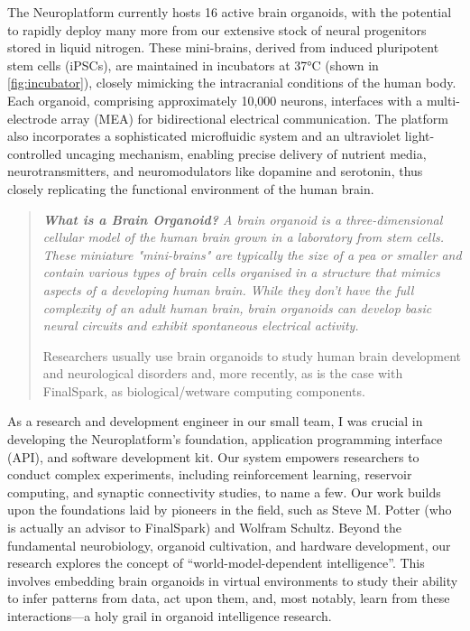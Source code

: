 \documentclass[10pt]{article}
\begin{document}
\begin{sloppypar}
  The Neuroplatform currently hosts 16 active brain organoids, with the potential to rapidly deploy many more from our extensive stock of neural progenitors stored in liquid nitrogen. These mini-brains, derived from induced pluripotent stem cells (iPSCs), are maintained in incubators at 37°C (shown in \autoref{fig:incubator}), closely mimicking the intracranial conditions of the human body. Each organoid, comprising approximately 10,000 neurons, interfaces with a multi-electrode array (MEA) for bidirectional electrical communication. The platform also incorporates a sophisticated microfluidic system and an ultraviolet light-controlled uncaging mechanism, enabling precise delivery of nutrient media, neurotransmitters, and neuromodulators like dopamine and serotonin, thus closely replicating the functional environment of the human brain.

  \begin{quote}
    \itshape
    \textbf{What is a Brain Organoid?}
    A brain organoid is a three-dimensional cellular model of the human brain grown in a laboratory from stem cells. These miniature "mini-brains" are typically the size of a pea or smaller and contain various types of brain cells organised in a structure that mimics aspects of a developing human brain. While they don't have the full complexity of an adult human brain, brain organoids can develop basic neural circuits and exhibit spontaneous electrical activity.

    Researchers usually use brain organoids to study human brain development and neurological disorders and, more recently, as is the case with FinalSpark, as biological/wetware computing components.
  \end{quote}

  As a research and development engineer in our small team, I was crucial in developing the Neuroplatform’s foundation, application programming interface (API), and software development kit. Our system empowers researchers to conduct complex experiments, including reinforcement learning, reservoir computing, and synaptic connectivity studies, to name a few. Our work builds upon the foundations laid by pioneers in the field, such as Steve M. Potter (who is actually an advisor to FinalSpark) and Wolfram Schultz. Beyond the fundamental neurobiology, organoid cultivation, and hardware development, our research explores the concept of “world-model-dependent intelligence”. This involves embedding brain organoids in virtual environments to study their ability to infer patterns from data, act upon them, and, most notably, learn from these interactions—a holy grail in organoid intelligence research.


\end{sloppypar}
\end{document}
